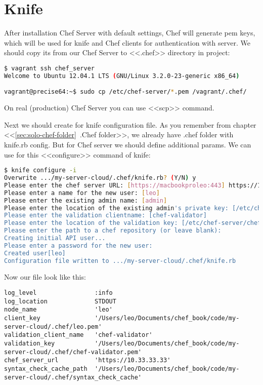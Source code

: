 \section{Knife}

After installation Chef Server with default settings, Chef will generate pem keys, which will be used for knife and Chef clients for authentication with server. We should copy its from our Chef Server to <<.chef>> directory in project:

\begin{lstlisting}[language=Bash,label=lst:my-server-cloud-knife1]
$ vagrant ssh chef_server
Welcome to Ubuntu 12.04.1 LTS (GNU/Linux 3.2.0-23-generic x86_64)

vagrant@precise64:~$ sudo cp /etc/chef-server/*.pem /vagrant/.chef/
\end{lstlisting}

On real (production) Chef Server you can use <<scp>> command.

Next we should create for knife configuration file. As you remember from chapter <<\ref{sec:solo-chef-folder}~.Chef folder>>, we already have .chef folder with knife.rb config. But for Chef server we should define additional params. We can use for this <<configure>> command of knife:

\begin{lstlisting}[language=Bash,label=lst:my-server-cloud-knife2]
$ knife configure -i
Overwrite .../my-server-cloud/.chef/knife.rb? (Y/N) y
Please enter the chef server URL: [https://macbookproleo:443] https://10.33.33.33
Please enter a name for the new user: [leo]
Please enter the existing admin name: [admin]
Please enter the location of the existing admin's private key: [/etc/chef-server/admin.pem] .chef/admin.pem
Please enter the validation clientname: [chef-validator]
Please enter the location of the validation key: [/etc/chef-server/chef-validator.pem] .chef/chef-validator.pem
Please enter the path to a chef repository (or leave blank):
Creating initial API user...
Please enter a password for the new user:
Created user[leo]
Configuration file written to .../my-server-cloud/.chef/knife.rb
\end{lstlisting}

Now our file look like this:

\begin{lstlisting}[label=lst:my-server-cloud-knife3,title=my-server-cloud/.chef/knife.rb]
log_level                :info
log_location             STDOUT
node_name                'leo'
client_key               '/Users/leo/Documents/chef_book/code/my-server-cloud/.chef/leo.pem'
validation_client_name   'chef-validator'
validation_key           '/Users/leo/Documents/chef_book/code/my-server-cloud/.chef/chef-validator.pem'
chef_server_url          'https://10.33.33.33'
syntax_check_cache_path  '/Users/leo/Documents/chef_book/code/my-server-cloud/.chef/syntax_check_cache'
\end{lstlisting}

